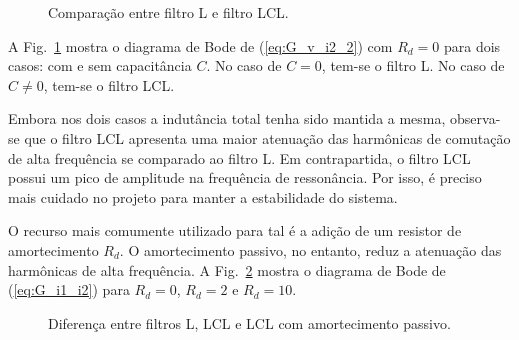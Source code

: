     \begin{figure}[htb]
        \caption{Comparação entre filtro L e filtro LCL.}
        \label{fig:L_vs_LCL}
    \end{figure}

    A Fig.~\ref{fig:L_vs_LCL} mostra o diagrama de Bode de (\ref{eq:G_v_i2_2})
    com $R_d = 0$ para dois casos: com e sem capacitância $C$. No caso de $C = 0$,
    tem-se o filtro L. No caso de $C \neq 0$, tem-se o filtro LCL.

    Embora nos dois casos a indutância total tenha sido mantida a mesma, observa-se
    que o filtro LCL apresenta uma maior atenuação das harmônicas de comutação
    de alta frequência se comparado ao filtro L. Em contrapartida, o filtro LCL
    possui um pico de amplitude na frequência de ressonância. Por isso, é preciso
    mais cuidado no projeto para manter a estabilidade do sistema.

    O recurso mais comumente utilizado para tal é a adição de um resistor de
    amortecimento $R_d$. O amortecimento passivo, no entanto, reduz a atenuação
    das harmônicas de alta frequência. A Fig.~\ref{fig:R_in_LCL} mostra o diagrama
    de Bode de (\ref{eq:G_i1_i2}) para $R_d = 0$, $R_d = 2$ e $R_d = 10$.

    \begin{figure}[htb]
        \caption{Diferença entre filtros L, LCL e LCL com amortecimento passivo.}
        \label{fig:R_in_LCL}
    \end{figure}

